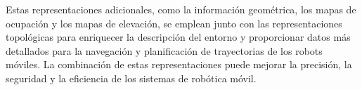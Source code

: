 \documentclass{article}
\begin{document}
\begin{itemize}
\begin{itemize}
  \end{itemize}

  Estas representaciones adicionales, como la información geométrica, los mapas de ocupación y los mapas de elevación, se emplean junto con las representaciones topológicas para enriquecer la descripción del entorno y proporcionar datos más detallados para la navegación y planificación de trayectorias de los robots móviles. La combinación de estas representaciones puede mejorar la precisión, la seguridad y la eficiencia de los sistemas de robótica móvil.

  
  \end{itemize}



\end{document}
